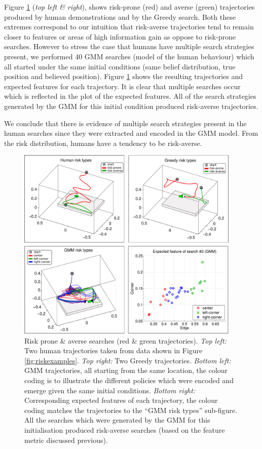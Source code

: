 Figure \ref{fig:risk_examples} (\textit{top left \& right}), shows risk-prone (red) and 
averse (green) trajectories produced by human demonstrations and by the Greedy search. Both these extremes
correspond to our intuition that risk-averse trajectories tend to remain closer to features or areas of high information gain
as oppose to risk-prone searches. However to stress the case that humans have multiple search strategies 
present, we performed 40 GMM searches (model of the human behaviour) which all started under the same initial conditions
(same belief distribution, true position and believed position). Figure \ref{fig:risk_examples}
shows the resulting trajectories and expected features for each trajectory. 
It is clear that multiple searches occur which is reflected in the plot of the expected features. All of the 
search strategies generated by the GMM for this initial condition produced risk-averse trajectories.


We conclude that there is evidence of multiple search strategies present in the human searches since they were extracted and encoded in the GMM model. 
From the risk distribution, humans have a tendency to be risk-averse.

\begin{figure}
 \centering
  \includegraphics[width=0.95\textwidth]{./ch3-Search/Figures/Figure8}
  \caption{Risk prone \& averse searches (red \& green trajectories). \textit{Top left:}
  Two human trajectories taken from data shown in Figure \ref{fig:riskexamples}. 
  \textit{Top right:} Two Greedy trajectories. \textit{Bottom left:} GMM trajectories, all starting from the same location, the
  colour coding is to illustrate the different policies which were encoded and emerge given the same initial conditions. 
  \textit{Bottom right:} Corresponding expected features of each trajectory, the colour coding matches the trajectories 
  to the ``GMM risk types'' sub-figure. All the searches which were generated by the GMM for this initialisation produced
  risk-averse searches (based on the feature metric discussed previous).}
  \label{fig:risk_examples}
\end{figure}

